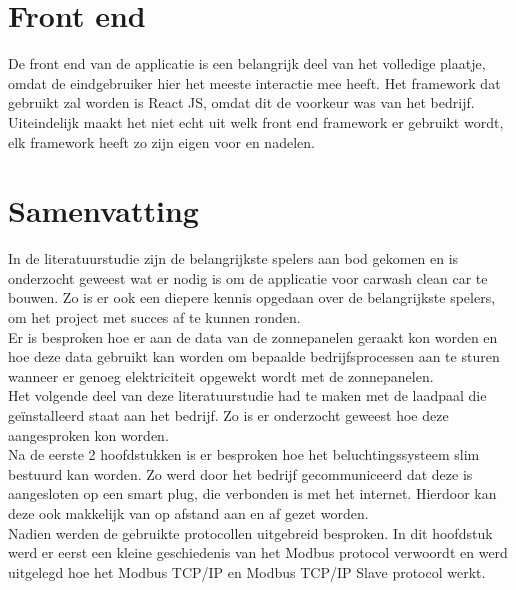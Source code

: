 \section{Front end}
\label{sec:stand-van-zaken-front-end}

De front end van de applicatie is een belangrijk deel van het volledige plaatje, omdat de eindgebruiker hier het meeste interactie mee heeft. Het framework dat gebruikt zal worden is React JS, omdat dit de voorkeur was van het bedrijf.\\

Uiteindelijk maakt het niet echt uit welk front end framework er gebruikt wordt, elk framework heeft zo zijn eigen voor en nadelen.

\section{Samenvatting}
\label{sec:stand-van-zaken-samenvatting}

In de literatuurstudie zijn de belangrijkste spelers aan bod gekomen en is onderzocht geweest wat er nodig is om de applicatie voor carwash clean car te bouwen. Zo is er ook een diepere kennis opgedaan over de belangrijkste spelers, om het project met succes af te kunnen ronden. \\

Er is besproken hoe er aan de data van de zonnepanelen geraakt kon worden en hoe deze data gebruikt kan worden om bepaalde bedrijfsprocessen aan te sturen wanneer er genoeg elektriciteit opgewekt wordt met de zonnepanelen.\\

Het volgende deel van deze literatuurstudie had te maken met de laadpaal die geïnstalleerd staat aan het bedrijf. Zo is er onderzocht geweest hoe deze aangesproken kon worden.\\

Na de eerste 2 hoofdstukken is er besproken hoe het beluchtingssysteem slim bestuurd kan worden. Zo werd door het bedrijf gecommuniceerd dat deze is aangesloten op een smart plug, die verbonden is met het internet. Hierdoor kan deze ook makkelijk van op afstand aan en af gezet worden.\\

Nadien werden de gebruikte protocollen uitgebreid besproken. In dit hoofdstuk werd er eerst een kleine geschiedenis van het Modbus protocol verwoordt en werd uitgelegd hoe het Modbus TCP/IP en Modbus TCP/IP Slave protocol werkt.\\

